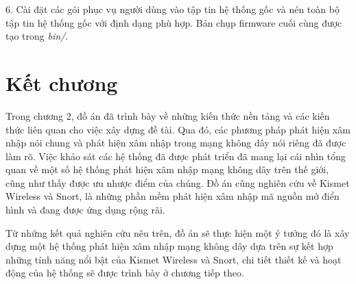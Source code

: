 6. Cài đặt các gói phục vụ người dùng vào tập tin hệ thống gốc và nén toàn bộ tập tin hệ thống gốc với định dạng phù hợp. Bản chụp firmware cuối cùng được tạo trong \emph{bin/}.

\section{Kết chương}
Trong chương 2, đồ án đã trình bày về những kiến thức nền tảng và các kiến thức liên quan cho việc xây dựng đề tài. Qua đó, các phương pháp phát hiện xâm nhập nói chung và phát hiện xâm nhập trong mạng không dây nói riêng đã được làm rõ. Việc khảo sát các hệ thống đã được phát triển đã mang lại cái nhìn tổng quan về một số hệ thống phát hiện xâm nhập mạng không dây trên thế giới, cũng như thấy được ưu nhược điểm của chúng. Đồ án cũng nghiên cứu về Kismet Wireless và Snort, là những phần mềm phát hiện xâm nhập mã nguồn mở điển hình và đang được ứng dụng rộng rãi.

Từ những kết quả nghiên cứu nêu trên, đồ án sẽ thực hiện một ý tưởng đó là xây dựng một hệ thống phát hiện xâm nhập mạng không dây dựa trên sự kết hợp những tính năng nổi bật của Kismet Wireless và Snort, chi tiết thiết kế và hoạt động của hệ thống sẽ được trình bày ở chương tiếp theo.
